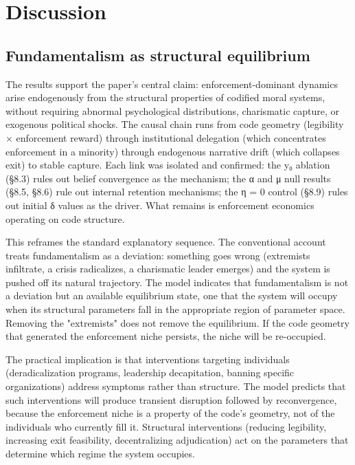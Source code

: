 \documentclass[12pt]{article}
\begin{document}
\section{Discussion}

%
\subsection{Fundamentalism as structural equilibrium}

The results support the paper's central claim: enforcement-dominant dynamics arise endogenously from the structural properties of codified moral systems, without requiring abnormal psychological distributions, charismatic capture, or exogenous political shocks. The causal chain runs from code geometry (legibility × enforcement reward) through institutional delegation (which concentrates enforcement in a minority) through endogenous narrative drift (which collapses exit) to stable capture. Each link was isolated and confirmed: the y₀ ablation (§8.3) rules out belief convergence as the mechanism; the α and μ null results (§8.5, §8.6) rule out internal retention mechanisms; the η = 0 control (§8.9) rules out initial δ values as the driver. What remains is enforcement economics operating on code structure.

This reframes the standard explanatory sequence. The conventional account treats fundamentalism as a deviation: something goes wrong (extremists infiltrate, a crisis radicalizes, a charismatic leader emerges) and the system is pushed off its natural trajectory. The model indicates that fundamentalism is not a deviation but an available equilibrium state, one that the system will occupy when its structural parameters fall in the appropriate region of parameter space. Removing the "extremists" does not remove the equilibrium. If the code geometry that generated the enforcement niche persists, the niche will be re-occupied.

The practical implication is that interventions targeting individuals (deradicalization programs, leadership decapitation, banning specific organizations) address symptoms rather than structure. The model predicts that such interventions will produce transient disruption followed by reconvergence, because the enforcement niche is a property of the code's geometry, not of the individuals who currently fill it. Structural interventions (reducing legibility, increasing exit feasibility, decentralizing adjudication) act on the parameters that determine which regime the system occupies.
\end{document}
